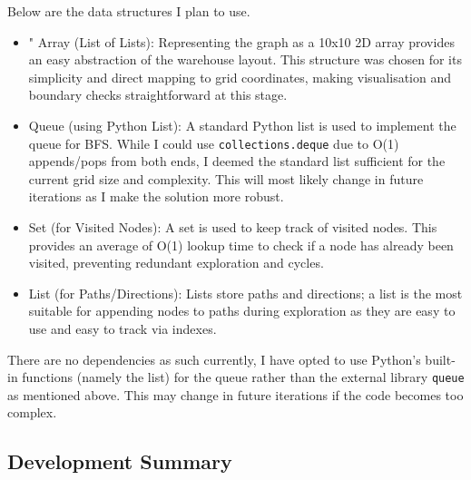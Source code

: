 Below are the data structures I plan to use.
\begin{itemize}
    \item " Array (List of Lists): Representing the graph as a 10x10 2D array provides an easy abstraction of the warehouse layout. This structure was chosen for its simplicity and direct mapping to grid coordinates, making visualisation and boundary checks straightforward at this stage.
    \item Queue (using Python List): A standard Python list is used to implement the queue for BFS. While I could use \verb|collections.deque| due to O(1) appends/pops from both ends, I deemed the standard list sufficient for the current grid size and complexity. This will most likely change in future iterations as I make the solution more robust.
    \item Set (for Visited Nodes): A set is used to keep track of visited nodes. This provides an average of O(1) lookup time to check if a node has already been visited, preventing redundant exploration and cycles.
    \item List (for Paths/Directions): Lists store paths and directions; a list is the most suitable for appending nodes to paths during exploration as they are easy to use and easy to track via indexes.

\end{itemize}

There are no dependencies as such currently, I have opted to use Python's built-in functions (namely the list) for the queue rather than the external library \verb|queue| as mentioned above. This may change in future iterations if the code becomes too complex.

\newpage

\subsection{Development Summary}

